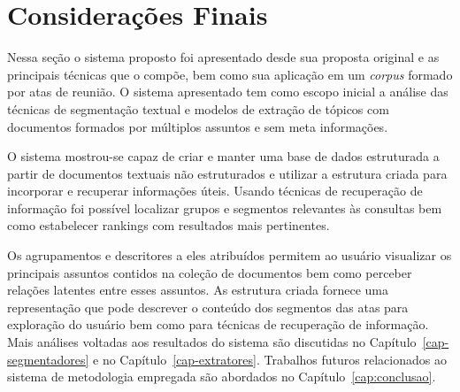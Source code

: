 \section{Considerações Finais}

Nessa seção o sistema proposto foi apresentado desde sua proposta original e as principais técnicas que o compõe, bem como sua aplicação em um \textit{corpus} formado por atas de reunião. O sistema apresentado tem como escopo inicial a análise das técnicas de segmentação textual e modelos de extração de tópicos com documentos formados por múltiplos assuntos e sem meta informações. 

O sistema mostrou-se capaz de criar e manter uma base de dados estruturada a partir de documentos textuais não estruturados e utilizar a estrutura criada para incorporar e  recuperar informações úteis. Usando técnicas de recuperação de informação foi possível localizar grupos e segmentos relevantes às consultas bem como estabelecer rankings com resultados mais pertinentes.

Os agrupamentos e descritores a eles atribuídos permitem ao usuário visualizar os principais assuntos contidos na coleção de documentos bem como perceber relações latentes entre esses assuntos. As estrutura criada fornece uma representação que pode descrever o conteúdo dos segmentos das atas para exploração do usuário bem como para técnicas de recuperação de informação. Mais análises voltadas aos resultados do sistema são discutidas no Capítulo~\ref{cap-segmentadores} e no Capítulo~\ref{cap-extratores}. Trabalhos futuros relacionados ao sistema de metodologia empregada são abordados no Capítulo~\ref{cap:conclusao}.






























